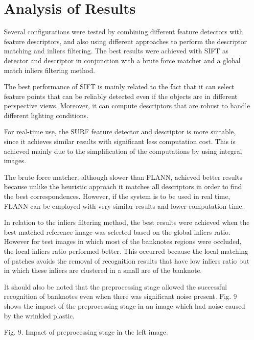 \section{Analysis of Results}\label{sec:results-analysis}

Several configurations were tested by combining different feature detectors with feature descriptors, and also using different approaches to perform the descriptor matching and inliers filtering. The best results were achieved with SIFT as detector and descriptor in conjunction with a brute force matcher and a global match inliers filtering method.

The best performance of SIFT is mainly related to the fact that it can select feature points that can be reliably detected even if the objects are in different perspective views. Moreover, it can compute descriptors that are robust to handle different lighting conditions.

For real-time use, the SURF feature detector and descriptor is more suitable, since it achieves similar results with significant less computation cost. This is achieved mainly due to the simplification of the computations by using integral images.

The brute force matcher, although slower than FLANN, achieved better results because unlike the heuristic approach it matches all descriptors in order to find the best correspondences. However, if the system is to be used in real time, FLANN can be employed with very similar results and lower computation time.

In relation to the inliers filtering method, the best results were achieved when the best matched reference image was selected based on the global inliers ratio. However for test images in which most of the banknotes regions were occluded, the local inliers ratio performed better. This occurred because the local matching of patches avoids the removal of recognition results that have low inliers ratio but in which these inliers are clustered in a small are of the banknote.

It should also be noted that the preprocessing stage allowed the successful recognition of banknotes even when there was significant noise present. Fig. 9 shows the impact of the preprocessing stage in an image which had noise caused by the wrinkled plastic.

Fig. 9. Impact of preprocessing stage in the left image.
